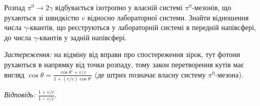 \begin{problem}
Розпад $\pi^0 \to 2\gamma$ відбувається ізотропно у власній системі $\pi^0$-мезонів, що рухаються зі швидкістю $v$ відносно лабораторної системи. Знайти відношення числа $\gamma$-квантів, що реєструються у лабораторній системі в передній напівсфері, до числа $\gamma$-квантів у задній напівсфері.

\emph{Застереження:} на відміну від вправи про спостереження зірок, тут фотони рухаються в напрямку від точки розпаду, тому закон перетворення кутів має вигляд $\cos\theta = \frac{\cos\theta' + v/c}{1 + (v/c)\cos\theta'}$ (де штрих позначає власну систему $\pi^0$-мезона).

\emph{Відповідь:} $\frac{1+v/c}{1-v/c}$.
\end{problem}
